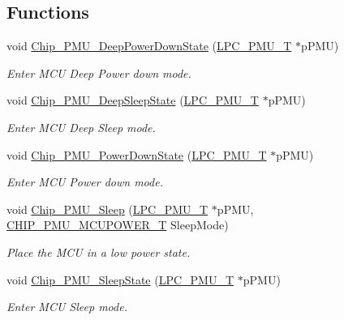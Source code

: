 \subsection*{Functions}
\begin{DoxyCompactItemize}
\item 
void \hyperlink{group__PMU__17XX__40XX_gad145abba9dc403d8db57c6b328f8d0c4}{Chip\+\_\+\+P\+M\+U\+\_\+\+Deep\+Power\+Down\+State} (\hyperlink{structLPC__PMU__T}{L\+P\+C\+\_\+\+P\+M\+U\+\_\+T} $\ast$p\+P\+MU)
\begin{DoxyCompactList}\small\item\em Enter M\+CU Deep Power down mode. \end{DoxyCompactList}\item 
void \hyperlink{group__PMU__17XX__40XX_gaf45cdc5409ccf675212a077341e80506}{Chip\+\_\+\+P\+M\+U\+\_\+\+Deep\+Sleep\+State} (\hyperlink{structLPC__PMU__T}{L\+P\+C\+\_\+\+P\+M\+U\+\_\+T} $\ast$p\+P\+MU)
\begin{DoxyCompactList}\small\item\em Enter M\+CU Deep Sleep mode. \end{DoxyCompactList}\item 
void \hyperlink{group__PMU__17XX__40XX_gaa99405714fbc2707643ea8dd36895a26}{Chip\+\_\+\+P\+M\+U\+\_\+\+Power\+Down\+State} (\hyperlink{structLPC__PMU__T}{L\+P\+C\+\_\+\+P\+M\+U\+\_\+T} $\ast$p\+P\+MU)
\begin{DoxyCompactList}\small\item\em Enter M\+CU Power down mode. \end{DoxyCompactList}\item 
void \hyperlink{group__PMU__17XX__40XX_gaca883204092fcbc6e4705a3461029220}{Chip\+\_\+\+P\+M\+U\+\_\+\+Sleep} (\hyperlink{structLPC__PMU__T}{L\+P\+C\+\_\+\+P\+M\+U\+\_\+T} $\ast$p\+P\+MU, \hyperlink{group__PMU__17XX__40XX_ga724dd269fe2bbc43740331f35c3bf463}{C\+H\+I\+P\+\_\+\+P\+M\+U\+\_\+\+M\+C\+U\+P\+O\+W\+E\+R\+\_\+T} Sleep\+Mode)
\begin{DoxyCompactList}\small\item\em Place the M\+CU in a low power state. \end{DoxyCompactList}\item 
void \hyperlink{group__PMU__17XX__40XX_ga8b2198dfa41da8da19c47a3b7d51283a}{Chip\+\_\+\+P\+M\+U\+\_\+\+Sleep\+State} (\hyperlink{structLPC__PMU__T}{L\+P\+C\+\_\+\+P\+M\+U\+\_\+T} $\ast$p\+P\+MU)
\begin{DoxyCompactList}\small\item\em Enter M\+CU Sleep mode. \end{DoxyCompactList}\end{DoxyCompactItemize}


